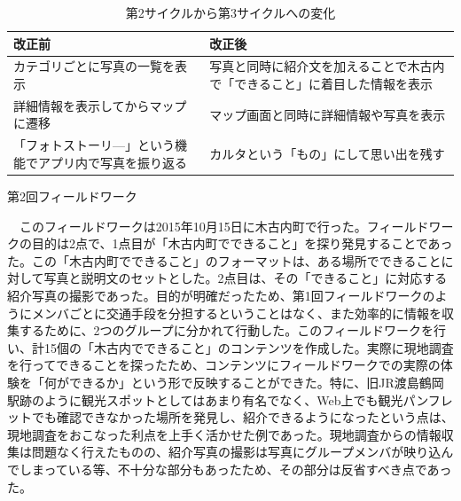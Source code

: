 \begin{table}[htb]
\centering
\addtocounter{table}{+0}
\caption{第2サイクルから第3サイクルへの変化}
  \begin{tabular}{|l|l|} \hline
    改正前&改正後  \\ \hline 
    \parbox{20zw}{カテゴリごとに写真の一覧を表示} & \parbox{20zw}{写真と同時に紹介文を加えることで木古内で「できること」に着目した情報を表示}\rule[-6mm]{0mm}{14mm} \\  \hline
    \parbox{20zw}{詳細情報を表示してからマップに遷移} &\parbox{20zw}{マップ画面と同時に詳細情報や写真を表示}\\ \hline
    \parbox{20zw}{「フォトストーリ—」という機能でアプリ内で写真を振り返る}\rule[-6mm]{0mm}{14mm} & \parbox{20zw}{カルタという「もの」にして思い出を残す}\\ \hline
  \end{tabular} 
\end{table}

\begin{description}
\item[第2回フィールドワーク]\mbox{}
\end{description}
　このフィールドワークは2015年10月15日に木古内町で行った。フィールドワークの目的は2点で、1点目が「木古内町でできること」を探り発見することであった。この「木古内町でできること」のフォーマットは、ある場所でできることに対して写真と説明文のセットとした。2点目は、その「できること」に対応する紹介写真の撮影であった。目的が明確だったため、第1回フィールドワークのようにメンバごとに交通手段を分担するということはなく、また効率的に情報を収集するために、2つのグループに分かれて行動した。このフィールドワークを行い、計15個の「木古内でできること」のコンテンツを作成した。実際に現地調査を行ってできることを探ったため、コンテンツにフィールドワークでの実際の体験を「何ができるか」という形で反映することができた。特に、旧JR渡島鶴岡駅跡のように観光スポットとしてはあまり有名でなく、Web上でも観光パンフレットでも確認できなかった場所を発見し、紹介できるようになったという点は、現地調査をおこなった利点を上手く活かせた例であった。現地調査からの情報収集は問題なく行えたものの、紹介写真の撮影は写真にグループメンバが映り込んでしまっている等、不十分な部分もあったため、その部分は反省すべき点であった。

